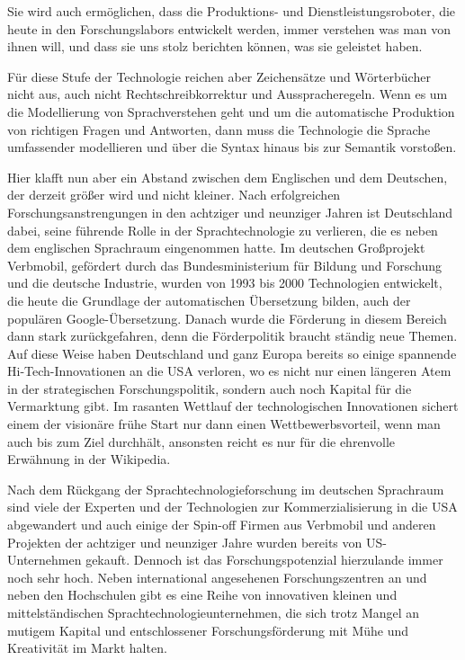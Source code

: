 \begin{multicols}{2}
Sie wird auch ermöglichen, dass die Produktions- und Dienstleistungsroboter, die heute in den Forschungslabors entwickelt werden, immer verstehen was man von ihnen will, und dass sie uns stolz berichten können, was sie geleistet haben. 

Für diese Stufe der Technologie reichen aber Zeichensätze und Wörterbücher nicht aus, auch nicht Rechtschreibkorrektur und Ausspracheregeln. Wenn es um die Modellierung von Sprachverstehen geht und um die automatische Produktion von richtigen Fragen und Antworten, dann muss die Technologie die Sprache umfassender modellieren und über die Syntax hinaus bis zur Semantik vorstoßen.

Hier klafft nun aber ein Abstand zwischen dem Englischen und dem Deutschen, der derzeit größer wird und nicht kleiner. Nach erfolgreichen Forschungsanstrengungen in den achtziger und neunziger Jahren ist Deutschland dabei, seine führende Rolle in der Sprachtechnologie zu verlieren, die es neben dem englischen Sprachraum eingenommen hatte. Im deutschen Großprojekt Verbmobil, gefördert durch das Bundesministerium für Bildung und Forschung und die deutsche Industrie, wurden von 1993 bis 2000 Technologien entwickelt, die heute die Grundlage der automatischen Übersetzung bilden, auch der populären Google-Übersetzung. Danach wurde die Förderung in diesem Bereich dann stark zurückgefahren, denn die Förderpolitik braucht ständig neue Themen. Auf diese Weise haben Deutschland und ganz Europa bereits so einige spannende Hi-Tech-Innovationen an die USA verloren, wo es nicht nur einen längeren Atem in der strategischen Forschungspolitik, sondern auch noch Kapital für die Vermarktung gibt. Im rasanten Wettlauf der technologischen Innovationen sichert einem der visionäre frühe Start nur dann einen Wettbewerbsvorteil, wenn man auch bis zum Ziel durchhält, ansonsten reicht es nur für die ehrenvolle Erwähnung in der Wikipedia. 

Nach dem Rückgang der Sprachtechnologieforschung im deutschen Sprachraum sind viele der Experten und der Technologien zur Kommerzialisierung in die USA abgewandert und auch einige der Spin-off Firmen aus Verbmobil und anderen Projekten der achtziger und neunziger Jahre wurden bereits von US-Unternehmen gekauft. Dennoch ist das Forschungspotenzial hierzulande immer noch sehr hoch. Neben international angesehenen Forschungszentren an und neben den Hochschulen gibt es eine Reihe von innovativen kleinen und mittelständischen Sprachtechnologieunternehmen, die sich trotz Mangel an mutigem Kapital und entschlossener Forschungsförderung mit Mühe und Kreativität im Markt halten. 


\end{multicols}
